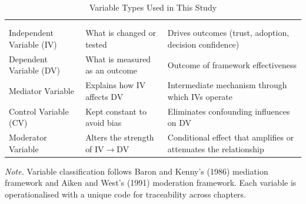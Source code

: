 {\tablestripes\tablefontsize
\begin{xltabular}{\textwidth}{@{} >{\raggedright\arraybackslash}p{3.8cm} p{4.5cm} L @{}}
\caption{Variable Types Used in This Study}\label{app_tab:variable_types} \\
\toprule
{} &  &  \\
\midrule
\endfirsthead
{} \\
\toprule
{} &  &  \\
\midrule
\endhead
\bottomrule
\endlastfoot
Independent Variable (IV) & What is changed or tested & Drives outcomes (trust, adoption, decision confidence) \\
\addlinespace
Dependent Variable (DV) & What is measured as an outcome & Outcome of framework effectiveness \\
\addlinespace
Mediator Variable & Explains how IV affects DV & Intermediate mechanism through which IVs operate \\
\addlinespace
Control Variable (CV) & Kept constant to avoid bias & Eliminates confounding influences on DV \\
\addlinespace
Moderator Variable & Alters the strength of IV$\to$DV & Conditional effect that amplifies or attenuates the relationship \\
\end{xltabular}}
\vspace{0.5em}\noindent\textit{Note.} Variable classification follows Baron and Kenny's (1986) mediation framework and Aiken and West's (1991) moderation framework. Each variable is operationalised with a unique code for traceability across chapters.

